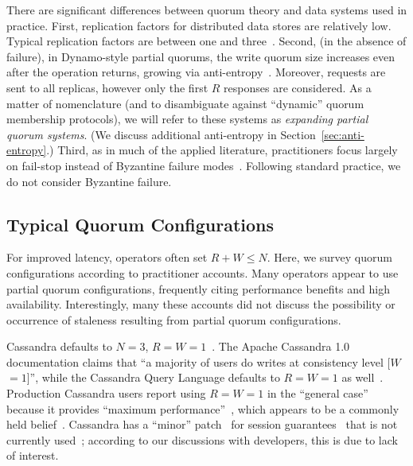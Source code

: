 \documentclass{vldb}
\newcommand{\subsectionskip}{-0em}
\begin{document}
There are significant differences between quorum theory and data
systems used in practice.  First, replication factors for distributed
data stores are relatively low.  Typical replication factors are
between one and three~\cite{cassandradefault, feinbergpc, codapc}.
Second, (in the absence of failure), in Dynamo-style partial quorums,
the write quorum size increases even after the operation returns,
growing via anti-entropy~\cite{antientropy}.  Moreover, requests are
sent to all replicas, however only the first $R$ responses are
considered.  As a matter of nomenclature (and to disambiguate against
``dynamic'' quorum membership protocols), we will refer to these
systems as \textit{expanding partial quorum systems}. (We discuss
additional anti-entropy in Section~\ref{sec:anti-entropy}.) Third, as
in much of the applied literature, practitioners focus largely on
fail-stop instead of Byzantine failure
modes~\cite{birman-byzantine}.  Following standard practice, we do not
consider Byzantine failure.


\vspace{\subsectionskip}\subsection{Typical Quorum Configurations}

For improved latency, operators often set $R+W \leq N$.  Here, we
survey quorum configurations according to practitioner accounts.  Many
operators appear to use partial quorum configurations, frequently
citing performance benefits and high availability. Interestingly, many
these accounts did not discuss the possibility or occurrence of
staleness resulting from partial quorum configurations.

Cassandra defaults to $N$$=$$3$,
$R$$=$$W$$=$$1$~\cite{cassandradefault}. The Apache Cassandra 1.0
documentation claims that ``a majority of users do writes at
consistency level [$W$$=$$1$]'', while the Cassandra Query Language
defaults to $R$$=$$W$$=$$1$ as well~\cite{cassandra-docs}.  Production
Cassandra users report using $R$$=$$W$$=$$1$ in the ``general case''
because it provides ``maximum performance''~\cite{maxperfblog}, which
appears to be a commonly held belief~\cite{reddit, outbrain}.
Cassandra has a ``minor'' patch~\cite{cassandra-session} for session
guarantees~\cite{sessionguarantees} that is not currently
used~\cite{cassandra-session-revert}; according to our
discussions with developers, this is due to lack of interest.
\end{document}
